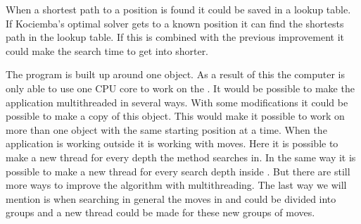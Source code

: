 	
When a shortest path to a position is found it could be saved in a lookup table.
If Kociemba's optimal solver gets to a known position it can find the shortests path in the lookup table.
If this is combined with the previous improvement it could make the search time to get into  shorter.
 
The program is built up around one \cube{} object.
As a result of this the computer is only able to use one CPU core to work on the \cube{}.
It would be possible to make the application multithreaded in several ways.
With some modifications it could be possible to make a copy of this \cube{} object.
This would make it possible to work on more than one \cube{} object with the same starting position at a time.
When the application is working outside  it is working with  moves.
Here it is possible to make a new thread for every depth the method searches in.
In the same way it is possible to make a new thread for every search depth inside .
But there are still more ways to improve the algorithm with multithreading.
The last way we will mention is when searching in general the moves in  and  could be divided into groups and a new thread could be made for these new groups of moves.